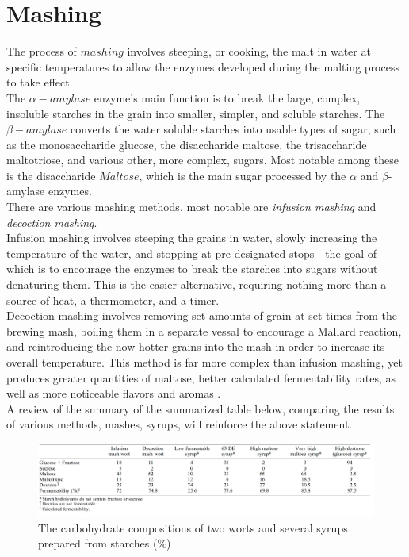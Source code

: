 \documentclass[twoside]{ctuthesis}
\theoremstyle{plain}
\theoremstyle{definition}
\theoremstyle{note}
\begin{document}
\section{Mashing}
The process of $mashing$ involves steeping, or cooking, the malt in water at specific temperatures to allow the enzymes developed during the malting process to take effect.\\
The $\alpha-amylase$ enzyme's main function is to break the large, complex, insoluble starches in the grain into smaller, simpler, and soluble starches. The $\beta-amylase$ converts the water soluble starches into usable types of sugar, such as the monosaccharide glucose, the disaccharide maltose, the trisaccharide maltotriose, and various other, more complex, sugars. Most notable among these is the disaccharide $Maltose$, which is the main sugar processed by the $\alpha$ and $\beta$-amylase enzymes.\\
There are various mashing methods, most notable are \textit{infusion mashing} and \textit{decoction mashing}.\\
Infusion mashing involves steeping the grains in water, slowly increasing the temperature of the water, and stopping at pre-designated stops - the goal of which is to encourage the enzymes to break the starches into sugars without denaturing them. This is the easier alternative, requiring nothing more than a source of heat, a thermometer, and a timer. \\
Decoction mashing involves removing set amounts of grain at set times from the brewing mash, boiling them in a separate vessal to encourage a Mallard reaction, and reintroducing the now hotter grains into the mash in order to increase its overall temperature. This method is far more complex than infusion mashing, yet produces greater quantities of maltose, better calculated fermentability rates, as well as more noticeable flavors and aromas \cite{Brewing_Science}.\\
A review of the summary of the summarized table below, comparing the results of various methods, mashes, syrups, will reinforce the above statement.

\begin{figure}[H]
	\centering
	\includegraphics[width = \textwidth]{MashingTable}
\begin{table}[H]
	\caption{The carbohydrate compositions of two worts and several syrups prepared from starches ($\%$)}
\end{table}
\end{figure}
\end{document}
